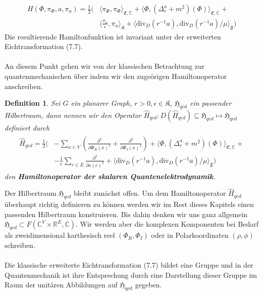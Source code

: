 \documentclass[11pt,a4paper,leqno]{report}
\newtheorem{definition}[theorem]{Definition}
\numberwithin{equation}{chapter}
\begin{document}
\begin{align*}
	H(\Phi, \pi_\Phi, a, \pi_a) = \frac{1}{2}(&\langle \pi_\Phi, \pi_\Phi\rangle_{\mathfrak{E},\mathbb{C}}+\langle \Phi, (\Delta_r^a + m^2)(\Phi)\rangle_{\mathfrak{E},\mathbb{C}}+\\ &\langle \frac{\pi_a}{\epsilon}, \pi_a\rangle_{\mathfrak{K}} + \langle \text{div}_D(r^{-1}a), \text{div}_D(r^{-1}a)/\mu\rangle_{\mathfrak{F}}) 
\end{align*}
Die resultierende Hamiltonfunktion ist invariant unter der erweiterten Eichtransformation (7.7). \\
\\
An diesem Punkt gehen wir von der klassischen Betrachtung zur quantenmechanischen \"uber indem wir den zuge\"origen Hamiltonoperator anschreiben.
\begin{definition}
	Sei $G$ ein planarer Graph, $r>0,\epsilon\in\mathfrak{K}$, $\mathfrak{H}_{qed}$ ein passender Hilbertraum, dann nennen wir den Operator $\hat{H}_{qed}:D(\hat{H}_{qed})\subseteq\mathfrak{H}_{qed}\mapsto\mathfrak{H}_{qed}$ definiert durch
	\begin{align}
		\begin{split}
		\hat{H}_{qed} = \frac{1}{2}(&-\sum_{x\in V}(\frac{\partial^2}{\partial\Phi_R(x)^2} +\frac{\partial^2}{\partial\Phi_I(x)^2})+\langle \Phi, (\Delta_r^a + m^2)(\Phi)\rangle_{\mathfrak{E},\mathbb{C}}+\\ &-\frac{1}{\epsilon}\sum_{e\in E}\frac{\partial^2}{\partial a(e)^2} + \langle \text{div}_D(r^{-1}a), \text{div}_D(r^{-1}a)/\mu\rangle_{\mathfrak{F}}) 
		\end{split}	
	\end{align}
	den \textbf{Hamiltonoperator der skalaren Quantenelektrodynamik}.
\end{definition}
\noindent
Der Hilbertraum $\mathfrak{H}_{qed}$ bleibt zun\"achst offen. Um dem Hamiltonoperator $\hat{H}_{qed}$ \"uberhaupt richtig definieren zu k\"onnen werden wir im Rest dieses Kapitels einen passenden Hilbertraum konstruieren. Bis dahin denken wir uns ganz allgemein $\mathfrak{H}_{qed}\subset F(\mathbb{C}^V\times\mathbb{R}^E,\mathbb{C})$. Wir werden aber die komplexen Komponenten bei Bedarf als zweidimensional karthesisch reel $(\Phi_R,\Phi_I)$ oder in Polarkoordinaten $(\rho,\phi)$ schreiben.\\
\\
Die klassische erweiterte Eichtransformation (7.7) bildet eine Gruppe und in der Quantenmechanik ist ihre Entsprechung durch eine Darstellung dieser Gruppe im Raum der unit\"aren Abbildungen auf $\mathfrak{H}_\text{qed}$ gegeben.
\end{document}
